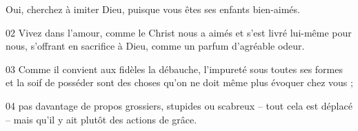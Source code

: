 Oui, cherchez à imiter Dieu, puisque vous êtes ses enfants bien-aimés.

02 Vivez dans l’amour, comme le Christ nous a aimés et s’est livré lui-même pour nous, s’offrant en sacrifice à Dieu, comme un parfum d’agréable odeur.

03 Comme il convient aux fidèles la débauche, l’impureté sous toutes ses formes et la soif de posséder sont des choses qu’on ne doit même plus évoquer chez vous ;

04 pas davantage de propos grossiers, stupides ou scabreux – tout cela est déplacé – mais qu’il y ait plutôt des actions de grâce.
